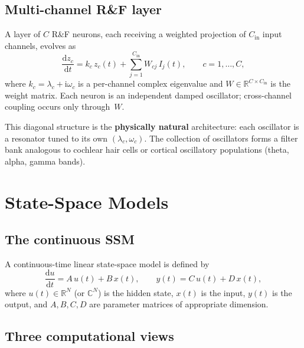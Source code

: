 \documentclass[11pt]{article}
\newcommand{\R}{\mathbb{R}}
\newcommand{\C}{\mathbb{C}}
\newcommand{\im}{\mathrm{i}}
\newcommand{\dd}{\mathrm{d}}
\theoremstyle{definition}
\begin{document}
\subsection{Multi-channel R\&F layer}\label{sec:rf-multichannel}

A layer of $C$ R\&F neurons, each receiving a weighted projection of
$C_{\mathrm{in}}$ input channels, evolves as
\begin{equation}\label{eq:rf-layer}
  \frac{\dd z_c}{\dd t}
    = k_c\,z_c(t) + \sum_{j=1}^{C_{\mathrm{in}}} W_{cj}\,I_j(t),
  \qquad c=1,\dots,C,
\end{equation}
where $k_c = \lambda_c + \im\omega_c$ is a per-channel complex eigenvalue
and $W\in\R^{C\times C_{\mathrm{in}}}$ is the weight matrix.
Each neuron is an independent damped oscillator; cross-channel coupling
occurs only through~$W$.

This diagonal structure is the \textbf{physically natural} architecture:
each oscillator is a resonator tuned to its own $(\lambda_c,\omega_c)$.
The collection of oscillators forms a filter bank analogous to cochlear
hair cells or cortical oscillatory populations (theta, alpha, gamma bands).

\section{State-Space Models}\label{sec:ssm}

\subsection{The continuous SSM}

A continuous-time linear state-space model is defined by
\begin{equation}\label{eq:ssm-continuous}
  \frac{\dd u}{\dd t} = A\,u(t) + B\,x(t),
  \qquad y(t) = C\,u(t) + D\,x(t),
\end{equation}
where $u(t)\in\R^N$ (or $\C^N$) is the hidden state, $x(t)$ is the
input, $y(t)$ is the output, and $A,B,C,D$ are parameter matrices of
appropriate dimension.

\subsection{Three computational views}
\end{document}

